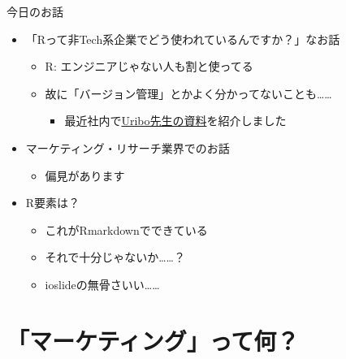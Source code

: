 \documentclass[ignorenonframetext,]{beamer}
\providecommand{\tightlist}{%
  \setlength{\itemsep}{0pt}\setlength{\parskip}{0pt}}
\begin{document}
\begin{frame}{今日のお話}

\begin{itemize}
\tightlist
\item
  「Rって非Tech系企業でどう使われているんですか？」なお話

  \begin{itemize}
  \tightlist
  \item
    R: エンジニアじゃない人も割と使ってる
  \item
    故に「バージョン管理」とかよく分かってないことも\ldots{}\ldots{}

    \begin{itemize}
    \tightlist
    \item
      最近社内で\href{https://speakerdeck.com/s_uryu/rstudio-for-team}{Uribo先生の資料}を紹介しました
    \end{itemize}
  \end{itemize}
\item
  マーケティング・リサーチ業界でのお話

  \begin{itemize}
  \tightlist
  \item
    偏見があります
  \end{itemize}
\item
  R要素は？

  \begin{itemize}
  \tightlist
  \item
    これがRmarkdownでできている
  \item
    それで十分じゃないか\ldots{}\ldots{}？
  \item
    ioslideの無骨さいい\ldots{}\ldots{}
  \end{itemize}
\end{itemize}

\end{frame}

\section{「マーケティング」って何？}
\end{document}
